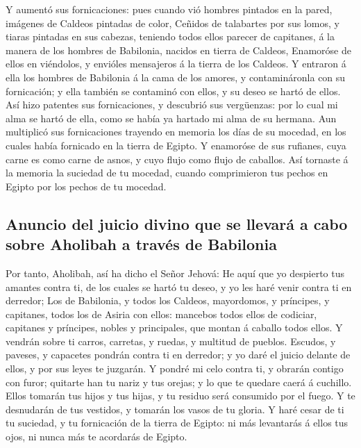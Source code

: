  Y aumentó sus fornicaciones: pues cuando vió hombres
pintados en la pared, imágenes de Caldeos pintadas de color,
 Ceñidos de talabartes por sus lomos, y tiaras pintadas en
sus cabezas, teniendo todos ellos parecer de capitanes, á la manera de
los hombres de Babilonia, nacidos en tierra de Caldeos, 
Enamoróse de ellos en viéndolos, y envióles mensajeros á la tierra de
los Caldeos.  Y entraron á ella los hombres de Babilonia á
la cama de los amores, y contamináronla con su fornicación; y ella
también se contaminó con ellos, y su deseo se hartó de ellos.
 Así hizo patentes sus fornicaciones, y descubrió sus
vergüenzas: por lo cual mi alma se hartó de ella, como se había ya
hartado mi alma de su hermana.  Aun multiplicó sus
fornicaciones trayendo en memoria los días de su mocedad, en los cuales
había fornicado en la tierra de Egipto.  Y enamoróse de sus
rufianes, cuya carne es como carne de asnos, y cuyo flujo como flujo de
caballos.  Así tornaste á la memoria la suciedad de tu
mocedad, cuando comprimieron tus pechos en Egipto por los pechos de tu
mocedad.

\hypertarget{anuncio-del-juicio-divino-que-se-llevaruxe1-a-cabo-sobre-aholibah-a-travuxe9s-de-babilonia}{%
\subsection{Anuncio del juicio divino que se llevará a cabo sobre
Aholibah a través de
Babilonia}\label{anuncio-del-juicio-divino-que-se-llevaruxe1-a-cabo-sobre-aholibah-a-travuxe9s-de-babilonia}}

 Por tanto, Aholibah, así ha dicho el Señor Jehová: He aquí
que yo despierto tus amantes contra ti, de los cuales se hartó tu deseo,
y yo les haré venir contra ti en derredor;  Los de
Babilonia, y todos los Caldeos, mayordomos, y príncipes, y capitanes,
todos los de Asiria con ellos: mancebos todos ellos de codiciar,
capitanes y príncipes, nobles y principales, que montan á caballo todos
ellos.  Y vendrán sobre ti carros, carretas, y ruedas, y
multitud de pueblos. Escudos, y paveses, y capacetes pondrán contra ti
en derredor; y yo daré el juicio delante de ellos, y por sus leyes te
juzgarán.  Y pondré mi celo contra ti, y obrarán contigo
con furor; quitarte han tu nariz y tus orejas; y lo que te quedare caerá
á cuchillo. Ellos tomarán tus hijos y tus hijas, y tu residuo será
consumido por el fuego.  Y te desnudarán de tus vestidos, y
tomarán los vasos de tu gloria.  Y haré cesar de ti tu
suciedad, y tu fornicación de la tierra de Egipto: ni más levantarás á
ellos tus ojos, ni nunca más te acordarás de Egipto.

